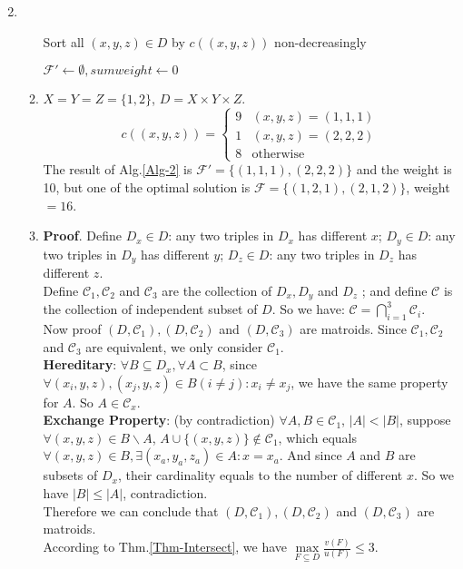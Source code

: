 \documentclass[12pt,a4paper]{article}
\makeatletter
\newtheorem*{solution}{Solution}
\theoremstyle{definition}
\renewenvironment{solution}[1][Solution] {\par\pushQED{\qed}\normalfont\topsep6\p@\@plus6\p@\relax\trivlist\item[\hskip\labelsep\bfseries#1\@addpunct{.}]\ignorespaces}{\popQED\endtrivlist\@endpefalse} \makeatother
\makeatother
\begin{document}
\begin{enumerate}
\begin{solution}
\begin{enumerate}
\begin{minipage}[t]{0.89\textwidth}
\begin{algorithm}[H]
					Sort all $ (x,y,z) \in D$ by $ c((x,y,z)) $ non-decreasingly\;
					
					$ \mathcal{F'} \leftarrow \emptyset ,sumweight\leftarrow0$\;
					
					
					\;
					
				\end{algorithm}
			\end{minipage}
			\item $ X = Y = Z = \{1,2\} $, $ D = X\times Y\times Z $.
			$$c((x,y,z))=
			\begin{cases}
			9 &(x,y,z) = (1,1,1)\\
			1 &(x,y,z) = (2,2,2)\\
			8 &\text{otherwise}
			\end{cases}
			$$
			The result of Alg.\ref{Alg-2} is $ \mathcal{F'}=\{(1,1,1),(2,2,2)\} $ and the weight is 10, but one of the optimal solution is $ \mathcal{F}=\{(1,2,1),(2,1,2)\} $, weight$ = 16 $.
			\item
			\textbf{Proof}. Define $ D_x\in D $: any two triples in $ D_x $ has different $ x $; \quad$ D_y\in D $:  any two triples in $ D_y $ has different $ y $; \quad $ D_z\in D $: any two triples in $ D_z $ has different $ z $. \\ 
			Define $ \mathcal{C}_1,\mathcal{C}_2 $ and $ \mathcal{C}_3 $ are the collection of $ D_x,D_y $ and $ D_z $ ; and define $ \mathcal{C} $ is the collection of independent subset of $ D $. So we have: $ \mathcal{C}=\bigcap_{i=1}^{3} \mathcal{C}_{i} $.\\
			Now proof $ (D,\mathcal{C}_1),(D,\mathcal{C}_2) $ and $ (D,\mathcal{C}_3) $ are matroids. Since $ \mathcal{C}_1,\mathcal{C}_2 $ and $ \mathcal{C}_3 $ are equivalent, we only consider $ \mathcal{C}_1 $.\\
			\textbf{Hereditary}: $ \forall B\subseteq D_x, \forall A \subset B$, since $ \forall (x_i,y,z),(x_j,y,z)\in B(i\neq j): x_i\neq x_j $, we have the same property for $ A $. So $ A\in\mathcal{C}_x $.\\
			\textbf{Exchange Property}: (by contradiction) $\forall A,B\in \mathcal{C}_1$, $ |A|<|B| $, suppose $ \forall (x,y,z)\in B\backslash A$, $ A\cup \{(x,y,z)\}\notin \mathcal{C}_1$, which equals $ \forall (x,y,z)\in B,\exists (x_a,y_a,z_a) \in A: x = x_a $. And since $ A $ and $ B $ are subsets of $ D_x $, their cardinality equals to the number of different $ x $. So we have $ |B|\leq|A| $, contradiction.\\
			Therefore we can conclude that $ (D,\mathcal{C}_1),(D,\mathcal{C}_2) $ and $ (D,\mathcal{C}_3) $ are matroids.\\
			According to Thm.\ref{Thm-Intersect}, we have  $\max\limits_{F \subseteq D} \frac{v(F)}{u(F)} \leq 3$. 
		\end{enumerate}
	\end{solution}



\end{enumerate}
\end{document}

